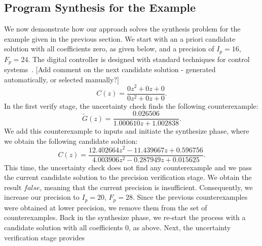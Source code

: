 \documentclass[final]{sig-alternate-05-2015}
\newcommand{\aabatecmt}[1]{{\color{blue}#1}}
\newcommand{\red}[1]{{\color{red}#1}}
\begin{document}
\subsection{Program Synthesis for the Example}
%
We now demonstrate how our approach solves the synthesis problem for the
example given in the previous section.  We start with an a priori candidate solution
with all coefficients zero, as given below, and a precision of $I_p=16$,
$F_p=24$.  The digital controller is designed with standard techniques for
control systems~\cite{Kuo:2002:ACS:579453, Ogata:1987:DCS:26170}. 
\aabatecmt{[Add comment on the next candidate solution - generated automatically, or selected manually?]}
%
%
$$ 
C(z)=\frac{0z^2{+}0z{+}0}{0z^2{+}0z{+}0}. 
$$
In the first {\sc verify} stage, the {\sc uncertainty} 
check finds the following counterexample:
%
$$ 
\tilde G(z) = \frac{0.026506}{1.000610z+1.002838}. 
$$
We add this counterexample to {\sc inputs} and initiate the {\sc synthesize}
phase, where we obtain the following candidate solution:
%
$$
C(z)=\frac{12.402664z^2{-}11.439667z{+}0.596756}{4.003906z^2{-}0.287949z{+}0.015625}. 
$$ 
This time, the {\sc uncertainty} check does not find any
counterexample and we pass the current candidate solution to the {\sc
precision} verification stage.
%
%
We obtain the result $\mathit{false}$, meaning that the current precision is
insufficient.  Consequently, we increase our precision to $I_p=20$, $F_p=28$.
%
Since the previous counterexamples were obtained at lower precision, we
remove them from the set of counterexamples.  Back in the {\sc synthesize}
phase, we re-start the process with a candidate solution with all
coefficients $0$, as above.  Next, the {\sc uncertainty} verification stage provides
\end{document}

